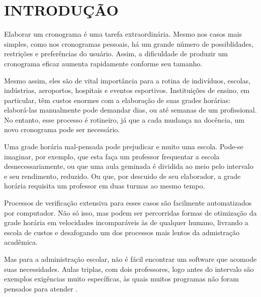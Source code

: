 \documentclass[12pt,a4paper]{article}
\begin{document}
	\newpage


	\section{INTRODUÇÃO}



		\par Elaborar um cronograma é uma tarefa extraordinária. Mesmo nos casos mais simples, como nos cronogramas pessoais, há um grande número de possiblidades, restrições e preferências do usuário. Assim, a dificuldade de produzir um cronograma eficaz aumenta rapidamente conforme seu tamanho.

		\par Mesmo assim, eles são de vital importância para a rotina de indivíduos, escolas, indústrias, aeroportos, hospitais e eventos esportivos. Instituições de ensino, em particular, têm custos enormes com a elaboração de suas grades horárias: elaborá-las manualmente pode demandar dias, ou até semanas \cite{appleby,nikita} de um profissional. No entanto, esse processo é rotineiro, já que a cada mudança na docência, um novo cronograma pode ser necessário.

		\par Uma grade horária mal-pensada pode prejudicar e muito uma escola. Pode-se imaginar, por exemplo, que esta faça um professor frequentar a escola desnecessariamente, ou que uma aula geminada é dividida ao meio pelo intervalo e seu rendimento, reduzido. Ou que, por descuido de seu elaborador, a grade horária requisita um professor em duas turmas ao mesmo tempo.

		\par Processos de verificação extensiva para esses casos são facilmente automatizados por computador. Não só isso, mas podem ser percorridas formas de otimização da grade horária em velocidades incomparáveis às de qualquer humano, livrando a escola de custos e desafogando um dos processos mais lentos da admistração acadêmica.

		\par Mas para a administração escolar, não é fácil encontrar um software que acomode suas necessidades. Aulas triplas, com dois professores, logo antes do intervalo são exemplos exigências muito específicas, às quais muitos programas não foram pensados para atender \cite{nikita, carter1995}.
\end{document}
